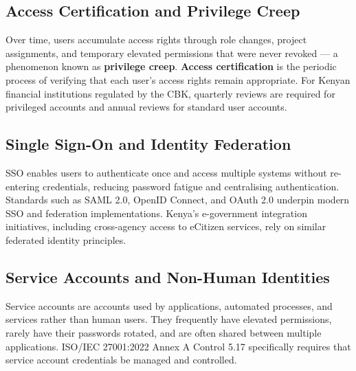 \documentclass[12pt,a4paper]{article}
\begin{document}
\subsection{Access Certification and Privilege Creep}

Over time, users accumulate access rights through role changes, project assignments, and temporary elevated permissions that were never revoked --- a phenomenon known as \textbf{privilege creep}. \textbf{Access certification} is the periodic process of verifying that each user's access rights remain appropriate. For Kenyan financial institutions regulated by the CBK, quarterly reviews are required for privileged accounts and annual reviews for standard user accounts.

\subsection{Single Sign-On and Identity Federation}

SSO enables users to authenticate once and access multiple systems without re-entering credentials, reducing password fatigue and centralising authentication. Standards such as SAML 2.0, OpenID Connect, and OAuth 2.0 underpin modern SSO and federation implementations. Kenya's e-government integration initiatives, including cross-agency access to eCitizen services, rely on similar federated identity principles.

\subsection{Service Accounts and Non-Human Identities}

Service accounts are accounts used by applications, automated processes, and services rather than human users. They frequently have elevated permissions, rarely have their passwords rotated, and are often shared between multiple applications. ISO/IEC 27001:2022 Annex A Control 5.17 specifically requires that service account credentials be managed and controlled.
\end{document}

